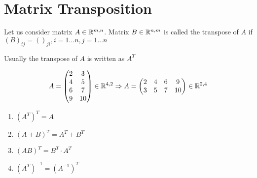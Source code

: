 \section{Matrix Transposition}
\begin{definition}
Let us consider matrix $A\in\mathbb{R}^{m,n}$. Matrix $B\in\mathbb{R}^{n,m}$ is called the transpose of $A$ if $(B)_{ij} = ()_{ji}, i=1\dots n, j=1\dots n$
\end{definition}
\begin{notation}
Usually the transpose of $A$ is written as $A^T$	
\end{notation}
\begin{example}
\[
A = \begin{pmatrix}
2 & 3\\
4 & 5\\
6 & 7\\
9 & 10
\end{pmatrix} \in\mathbb{R}^{4,2} \Rightarrow A = \begin{pmatrix}
2 & 4 & 6 & 9\\
3 & 5 & 7 & 10
\end{pmatrix} \in\mathbb{R}^{2,4}
\]	
\end{example}
\begin{properties}
\begin{enumerate}
\item $\left( A^T\right)^T = A$
\item $\left( A+B\right)^T = A^T + B^T$
\item $\left( AB\right)^T = B^T\cdot A^T$
\item $\left( A^T\right)^{-1} = \left( A^{-1}\right)^{T}$
\end{enumerate}
\end{properties}
